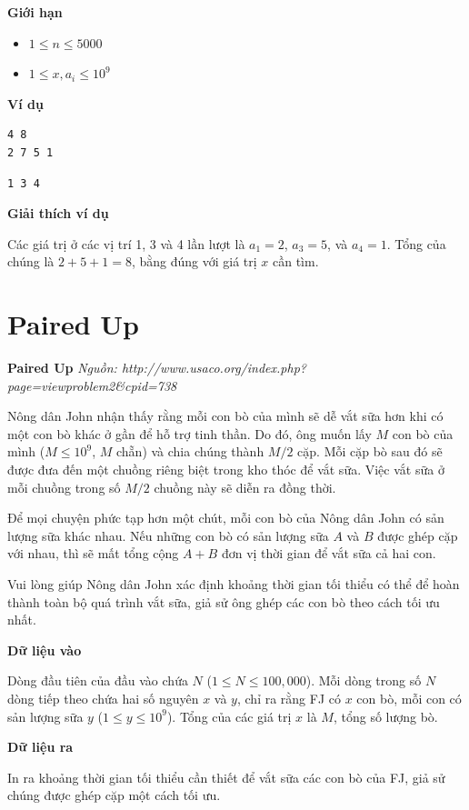 \documentclass[12pt,a4paper]{article}
\newcommand{\problem}[2]{%
  \begin{mdframed}[
    linecolor=framecolor,
    linewidth=1.5pt,
    backgroundcolor=white,
    topline=true, bottomline=true,
    leftline=true, rightline=true,
    innerleftmargin=10pt, innerrightmargin=10pt,
    innertopmargin=6pt, innerbottommargin=6pt,
  ]
  \textbf{\large #1} \hfill \textit{Nguồn: #2}
  \end{mdframed}
  \vspace{4pt}%
}
\newcommand{\inputformat}{%
  \vspace{6pt}\textbf{\textcolor{sectioncolor}{Dữ liệu vào}}\par\vspace{2pt}%
}
\newcommand{\outputformat}{%
  \vspace{6pt}\textbf{\textcolor{sectioncolor}{Dữ liệu ra}}\par\vspace{2pt}%
}
\newcommand{\constraints}{%
  \vspace{6pt}\textbf{\textcolor{sectioncolor}{Giới hạn}}\par\vspace{2pt}%
}
\newcommand{\example}{%
  \vspace{6pt}\textbf{\textcolor{sectioncolor}{Ví dụ}}\par\vspace{2pt}%
}
\newcommand{\explanation}{%
  \vspace{6pt}\textbf{\textcolor{sectioncolor}{Giải thích ví dụ}}\par\vspace{2pt}%
}
\begin{document}
\constraints
\begin{constraintbox}
\begin{itemize}
    \item $1 \le n \le 5000$
    \item $1 \le x, a_i \le 10^9$
\end{itemize}
\end{constraintbox}

\example
\begin{lstlisting}
4 8
2 7 5 1
\end{lstlisting}
\begin{lstlisting}
1 3 4
\end{lstlisting}

\explanation
Các giá trị ở các vị trí 1, 3 và 4 lần lượt là $a_1 = 2$, $a_3 = 5$, và $a_4 = 1$. Tổng của chúng là $2 + 5 + 1 = 8$, bằng đúng với giá trị $x$ cần tìm.


\section{Paired Up}
\problem{Paired Up}{http://www.usaco.org/index.php?page=viewproblem2\&cpid=738}

Nông dân John nhận thấy rằng mỗi con bò của mình sẽ dễ vắt sữa hơn khi có một con bò khác ở gần để hỗ trợ tinh thần. Do đó, ông muốn lấy $M$ con bò của mình ($M \le 10^9$, $M$ chẵn) và chia chúng thành $M/2$ cặp. Mỗi cặp bò sau đó sẽ được đưa đến một chuồng riêng biệt trong kho thóc để vắt sữa. Việc vắt sữa ở mỗi chuồng trong số $M/2$ chuồng này sẽ diễn ra đồng thời.

Để mọi chuyện phức tạp hơn một chút, mỗi con bò của Nông dân John có sản lượng sữa khác nhau. Nếu những con bò có sản lượng sữa $A$ và $B$ được ghép cặp với nhau, thì sẽ mất tổng cộng $A+B$ đơn vị thời gian để vắt sữa cả hai con.

Vui lòng giúp Nông dân John xác định khoảng thời gian tối thiểu có thể để hoàn thành toàn bộ quá trình vắt sữa, giả sử ông ghép các con bò theo cách tối ưu nhất.

\inputformat
\begin{inputbox}
Dòng đầu tiên của đầu vào chứa $N$ ($1 \le N \le 100,000$). Mỗi dòng trong số $N$ dòng tiếp theo chứa hai số nguyên $x$ và $y$, chỉ ra rằng FJ có $x$ con bò, mỗi con có sản lượng sữa $y$ ($1 \le y \le 10^9$). Tổng của các giá trị $x$ là $M$, tổng số lượng bò.
\end{inputbox}

\outputformat
\begin{outputbox}
In ra khoảng thời gian tối thiểu cần thiết để vắt sữa các con bò của FJ, giả sử chúng được ghép cặp một cách tối ưu.
\end{outputbox}
\end{document}
